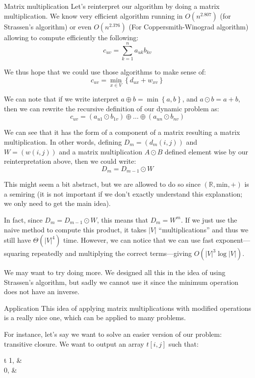 \documentclass[a4paper]{article}
\begin{document}
\begin{parag}{Matrix multiplication}
    Let's reinterpret our algorithm by doing a matrix multiplication. We know very efficient algorithm running in $O\left(n^{2.807}\right)$ (for Strassen's algorithm) or even $O\left(n^{2.376}\right)$ (For Coppersmith-Winograd algorithm) allowing to compute efficiently the following: 
    \[c_{uv} = \sum_{k=1}^{n} a_{uk} b_{kv}\]
    
    We thus hope that we could use those algorithms to make sense of: 
    \[c_{uv} = \min_{x \in V} \left\{d_{ux} + w_{xv}\right\}\]
    
    We can note that if we write interpret $a \oplus b = \min\left\{a, b\right\}$, and $a \odot b = a + b$, then we can rewrite the recursive definition of our dynamic problem as: 
    \[c_{uv} = \left(a_{u1} \odot b_{1v}\right) \oplus \ldots \oplus \left(a_{un} \odot b_{nv}\right)\]

    We can see that it has the form of a component of a matrix resulting a matrix multiplication. In other words, defining $D_m = \left(d_m\left(i, j\right)\right)$ and $W = \left(w\left(i, j\right)\right)$ and a matrix multiplication $A \odot B$ defined element wise by our reinterpretation above, then we could write: 
    \[D_m = D_{m-1} \odot W\]

    This might seem a bit abstract, but we are allowed to do so since $\left(\mathbb{R}, \text{min}, +\right)$ is a semiring (it is not important if we don't exactly understand this explanation; we only need to get the main idea).

    In fact, since $D_m = D_{m-1} \odot W$, this means that $D_m = W^m$. If we just use the naive method to compute this product, it takes $\left|V\right|$ ``multiplications'' and thus we still have $\Theta\left(\left|V\right|^4\right)$ time. However, we can notice that we can use fast exponent---squaring repeatedly and multiplying the correct terms---giving $O\left(\left|V\right|^3 \log\left|V\right|\right)$. 

    We may want to try doing more. We designed all this in the idea of using Strassen's algorithm, but sadly we cannot use it since the minimum operation does not have an inverse.


    \begin{subparag}{Application}
        This idea of applying matrix multiplications with modified operations is a really nice one, which can be applied to many problems.

        For instance, let's say we want to solve an easier version of our problem: transitive closure. We want to output an array $t\left[i, j\right]$ such that:
        \begin{functionbypart}{t\left[i, j\right]}
            1, &  \\
            0, & 
        \end{functionbypart}


\end{subparag}
\end{parag}
\end{document}
